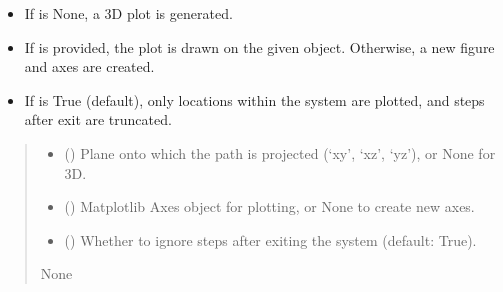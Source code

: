 \documentclass[letterpaper,10pt,english]{sphinxmanual}
\begin{document}
\begin{fulllineitems}
\begin{fulllineitems}
\begin{itemize}
\item {} 
\sphinxAtStartPar
If  is None, a 3D plot is generated.

\item {} 
\sphinxAtStartPar
If  is provided, the plot is drawn on the given  object.
Otherwise, a new figure and axes are created.

\item {} 
\sphinxAtStartPar
If  is True (default), only locations within the system are plotted,
and steps after exit are truncated.

\end{itemize}
\begin{quote}\begin{description}
\begin{itemize}
\item {} 
\sphinxAtStartPar
{} (\sphinxstyleliteralemphasis{\sphinxupquote{{[}}}\sphinxstyleliteralemphasis{\sphinxupquote{{]}}}) \textendash{} Plane onto which the path is projected (‘xy’, ‘xz’, ‘yz’), or None for 3D.

\item {} 
\sphinxAtStartPar
{} (\sphinxstyleliteralemphasis{\sphinxupquote{{[}}}\sphinxstyleliteralemphasis{\sphinxupquote{{]}}}) \textendash{} Matplotlib Axes object for plotting, or None to create new axes.

\item {} 
\sphinxAtStartPar
{} () \textendash{} Whether to ignore steps after exiting the system (default: True).

\end{itemize}

\sphinxAtStartPar
{}

\sphinxAtStartPar
None

\end{description}\end{quote}


\end{fulllineitems}
\end{fulllineitems}
\end{document}
